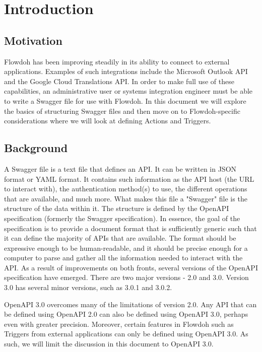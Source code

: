 \section{Introduction}
\subsection{Motivation}
Flowdoh has been improving steadily in its ability to connect to external applications. Examples of such integrations include the Microsoft Outlook API and the Google Cloud Translations API. In order to make full use of these capabilities, an administrative user or systems integration engineer must be able to write a Swagger file for use with Flowdoh. In this document we will explore the basics of structuring Swagger files and then move on to Flowdoh-specific considerations where we will look at defining Actions and Triggers.

\subsection{Background}
A Swagger file is a text file that defines an API. It can be written in JSON format or YAML format. It contains such information as the API host (the URL to interact with), the authentication method(s) to use, the different operations that are available, and much more. What makes this file a "Swagger" file is the structure of the data within it. The structure is defined by the OpenAPI specification (formerly the Swagger specification). In essence, the goal of the specification is to provide a document format that is sufficiently generic such that it can define the majority of APIs that are available. The format should be expressive enough to be human-readable, and it should be precise enough for a computer to parse and gather all the information needed to interact with the API. As a result of improvements on both fronts, several versions of the OpenAPI specification have emerged. There are two major versions - 2.0 and 3.0. Version 3.0 has several minor versions, such as 3.0.1 and 3.0.2.

OpenAPI 3.0 overcomes many of the limitations of version 2.0. Any API that can be defined using OpenAPI 2.0 can also be defined using OpenAPI 3.0, perhaps even with greater precision. Moreover, certain features in Flowdoh such as Triggers from external applications can only be defined using OpenAPI 3.0. As such, we will limit the discussion in this document to OpenAPI 3.0.